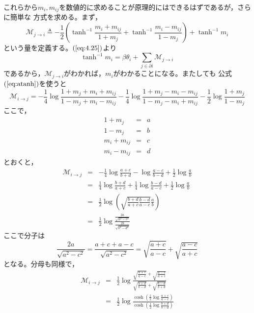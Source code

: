 これらから$m_{i},m_{ij}$を数値的に求めることが原理的にはできるはずであるが，さらに簡単な
方式を求める。まず，
\begin{equation}
\mathcal{M}_{j\rightarrow i}\triangleq-\frac{1}{2}
\left(\tanh^{-1}\frac{m_{i}+m_{ij}}{1+m_{j}}+\tanh^{-1}\frac{m_{i}-m_{ij}}{1-m_{j}}
\right)+\tanh^{-1}m_{i}\label{eq:4.32}
\end{equation}
という量を定義する。$(\ref{eq:4.25})$より
\begin{equation}
\tanh^{-1}m_{i}=\beta\theta_{i}+\sum_{j\in\partial i}\mathcal{M}_{j\rightarrow
i}
\label{eq:4.31}
\end{equation}
であるから，$\mathcal{M}_{j\rightarrow i}$がわかれば，$m_{i}$がわかることになる。またしても
公式$(\ref{eq:atanh})$を使うと
\begin{equation}
\mathcal{M}_{i\rightarrow j}=-\frac{1}{4}\log
\frac{1+m_{j}+m_{i}+m_{ij}}{1-m_{j}+m_{i}-m_{ij}}
-\frac{1}{4}\log\frac{1+m_{j}-m_{i}-m_{ij}}{1-m_{j}-m_{i}+m_{ij}}
-\frac{1}{2}\log\frac{1+m_{j}}{1-m_{j}}\nonumber
\end{equation}
ここで，
\begin{eqnarray}
1+m_{j}&=&a\nonumber\\
1-m_{j}&=&b\nonumber\\
m_{i}+m_{ij}&=&c\nonumber\\
m_{i}-m_{ij}&=&d\nonumber
\end{eqnarray}
とおくと，
\begin{eqnarray}
\mathcal{M}_{i\rightarrow
j}&=&-\frac{1}{4}\log\frac{a+c}{b+d}-\log\frac{a-c}{b-d}+\frac{1}{2}\log\frac{a}{b}
\nonumber\\
&=&\frac{1}{4}\log\frac{b+d}{a+c}+\frac{1}{4}\log\frac{b-d}{a-c}+\frac{1}{2}\log\frac{a}{b}
\nonumber\\
&=&\frac{1}{2}\log\left(\sqrt{\frac{b+d}{a+c}\frac{b-d}{a-c}}\frac{a}{b}\right)\nonumber\\
&=&\frac{1}{2}\log\frac{\displaystyle\frac{2a}{\sqrt{a^{2}-c^{2}}}}
{\displaystyle\frac{2b}{\sqrt{b^{2}-d^{2}}}}\nonumber
\end{eqnarray}
ここで分子は
\begin{equation}
\frac{2a}{\sqrt{a^{2}-c^{2}}}=\frac{a+c+a-c}{\sqrt{a^{2}-c^{2}}}
=\sqrt{\frac{a+c}{a-c}}+\sqrt{\frac{a-c}{a+c}}\nonumber
\end{equation}
となる。分母も同様で，
\begin{eqnarray}
\mathcal{M}_{i\rightarrow j}&=&\frac{1}{2}\log
\frac{\displaystyle\sqrt{\frac{a+c}{a-c}}+\sqrt{\frac{a-c}{a+c}}}
{\displaystyle\sqrt{\frac{b+d}{b-d}}+\sqrt{\frac{b-d}{b+d}}}\nonumber\\
&=&\frac{1}{2}\log\frac{\displaystyle\cosh\left(\frac{1}{2}\log\frac{a+c}{a-c}\right)}
{\displaystyle\cosh\left(\frac{1}{2}\log\frac{b+d}{b-d}\right)}\nonumber
\end{eqnarray}
